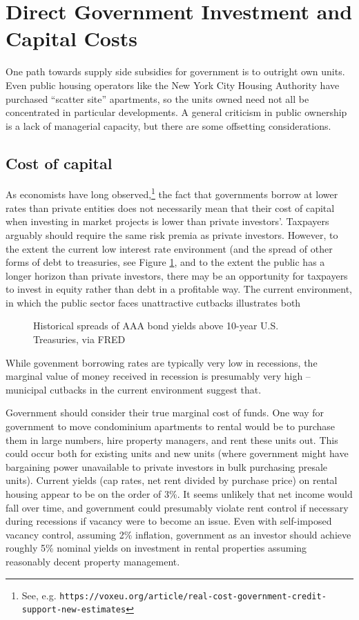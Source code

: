 \documentclass[12pt]{article}
\begin{document}
\section{Direct Government Investment and Capital Costs}

One path towards supply side subsidies for government is to outright own units. Even public housing operators like the New York City Housing Authority have purchased ``scatter site'' apartments, so the units owned need not all be concentrated in particular developments. A general criticism in public ownership is a lack of managerial capacity, but there are some offsetting considerations.

\subsection{Cost of capital}

As economists have long observed,\footnote{See, e.g. \texttt{https://voxeu.org/article/real-cost-government-credit-support-new-estimates}} the fact that governments borrow at lower rates than private entities does not necessarily mean that their cost of capital when investing in market projects is lower than private investors'. Taxpayers arguably should require the same risk premia as private investors. However, to the extent the current low interest rate environment (and the spread of other forms of debt to treasuries, see Figure \ref{fig:rates}, and to the extent the public has a longer horizon than private investors, there may be an opportunity for taxpayers to invest in equity rather than debt in a profitable way. The current environment, in which the public sector faces unattractive cutbacks illustrates both 

\begin{figure}
	\caption{\label{fig:rates} Historical spreads of AAA bond yields above 10-year U.S. Treasuries, via FRED}
\end{figure}

While govenment borrowing rates are typically very low in recessions, the marginal value of money received in recession is presumably very high -- municipal cutbacks in the current environment suggest that.

Government should consider their true marginal cost of funds. One way for government to move condominium apartments to rental would be to purchase them in large numbers, hire property managers, and rent these units out. This could occur both for existing units and new units (where government might have bargaining power unavailable to private investors in bulk purchasing presale units). Current yields (cap rates, net rent divided by purchase price) on rental housing appear to be on the order of 3\%. It seems unlikely that net income would fall over time, and government could presumably violate rent control if necessary during recessions if vacancy were to become an issue. Even with self-imposed vacancy control, assuming 2\% inflation, government as an investor should achieve roughly 5\% nominal yields on investment in rental properties assuming reasonably decent property management. 
\end{document}
